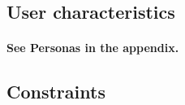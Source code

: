 



\subsection{User characteristics}
\paragraph{See Personas in the appendix.}

\subsection{Constraints}
